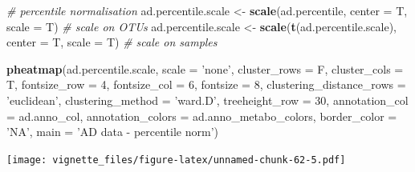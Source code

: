 \documentclass[]{book}
\newenvironment{Shaded}{\begin{snugshade}}{\end{snugshade}}
\newcommand{\KeywordTok}[1]{\textcolor[rgb]{0.13,0.29,0.53}{\textbf{#1}}}
\newcommand{\DataTypeTok}[1]{\textcolor[rgb]{0.13,0.29,0.53}{#1}}
\newcommand{\DecValTok}[1]{\textcolor[rgb]{0.00,0.00,0.81}{#1}}
\newcommand{\StringTok}[1]{\textcolor[rgb]{0.31,0.60,0.02}{#1}}
\newcommand{\CommentTok}[1]{\textcolor[rgb]{0.56,0.35,0.01}{\textit{#1}}}
\newcommand{\NormalTok}[1]{#1}
\begin{document}
\begin{Shaded}
\begin{Highlighting}[]
\CommentTok{# percentile normalisation}
\NormalTok{ad.percentile.scale <-}\StringTok{ }\KeywordTok{scale}\NormalTok{(ad.percentile, }\DataTypeTok{center =}\NormalTok{ T, }\DataTypeTok{scale =}\NormalTok{ T) }\CommentTok{# scale on OTUs}
\NormalTok{ad.percentile.scale <-}\StringTok{ }\KeywordTok{scale}\NormalTok{(}\KeywordTok{t}\NormalTok{(ad.percentile.scale), }\DataTypeTok{center =}\NormalTok{ T, }\DataTypeTok{scale =}\NormalTok{ T) }\CommentTok{# scale on samples}

\KeywordTok{pheatmap}\NormalTok{(ad.percentile.scale, }
         \DataTypeTok{scale =} \StringTok{'none'}\NormalTok{, }
         \DataTypeTok{cluster_rows =}\NormalTok{ F, }
         \DataTypeTok{cluster_cols =}\NormalTok{ T, }
         \DataTypeTok{fontsize_row =} \DecValTok{4}\NormalTok{, }\DataTypeTok{fontsize_col =} \DecValTok{6}\NormalTok{,}
         \DataTypeTok{fontsize =} \DecValTok{8}\NormalTok{,}
         \DataTypeTok{clustering_distance_rows =} \StringTok{'euclidean'}\NormalTok{,}
         \DataTypeTok{clustering_method =} \StringTok{'ward.D'}\NormalTok{,}
         \DataTypeTok{treeheight_row =} \DecValTok{30}\NormalTok{,}
         \DataTypeTok{annotation_col =}\NormalTok{ ad.anno_col,}
         \DataTypeTok{annotation_colors =}\NormalTok{ ad.anno_metabo_colors,}
         \DataTypeTok{border_color =} \StringTok{'NA'}\NormalTok{,}
         \DataTypeTok{main =} \StringTok{'AD data - percentile norm'}\NormalTok{)}
\end{Highlighting}
\end{Shaded}

\texttt{[image: vignette\_files/figure-latex/unnamed-chunk-62-5.pdf]}
\end{document}
